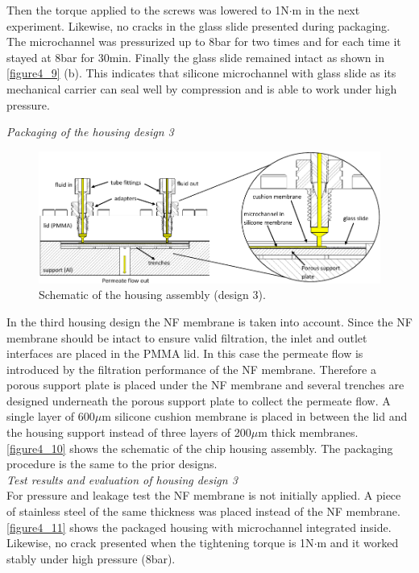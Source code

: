 Then the torque applied to the screws was lowered to 1N$\cdot$m in the next experiment. Likewise, no cracks in the glass slide presented during packaging. The microchannel was pressurized up to 8bar for two times and for each time it stayed at 8bar for 30min. Finally the glass slide remained intact as shown in \autoref{figure4_9} (b). This indicates that silicone microchannel with glass slide as its mechanical carrier can seal well by compression and is able to work under high pressure.

\noindent \textit{Packaging of the housing design 3}\\

\begin{figure}[h]%
\centering
\includegraphics[width=1\textwidth]{figures/packagingandtestunderhighpressure/figure4_10}%
\caption{Schematic of the housing assembly (design 3).}%
\label{figure4_10}%
\end{figure}

In the third housing design the NF membrane is taken into account. Since the NF membrane should be intact to ensure valid filtration, the inlet and outlet interfaces are placed in the PMMA lid. In this case the permeate flow is introduced by the filtration performance of the NF membrane. Therefore a porous support plate is placed under the NF membrane and several trenches are designed underneath the porous support plate to collect the permeate flow. A single layer of 600$\mu$m silicone cushion membrane is placed in between the lid and the housing support instead of three layers of 200$\mu$m thick membranes.  \autoref{figure4_10} shows the schematic of the chip housing assembly. The packaging procedure is the same to the prior designs.\\

\noindent \textit{Test results and evaluation of housing design 3}\\

For pressure and leakage test the NF membrane is not initially applied. A piece of stainless steel of the same thickness was placed instead of the NF membrane. \autoref{figure4_11} shows the packaged housing with microchannel integrated inside. Likewise, no crack presented when the tightening torque is 1N$\cdot$m and it worked stably under high pressure (8bar).\\
\clearpage

